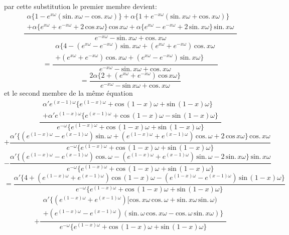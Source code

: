 \documentclass[11pt,a4paper]{article}
\begin{document}
par cette substitution le premier membre devient:
\[ \frac{\begin{array}{c}\alpha\{1 - e^{x\omega}(\text{sin.}\,x\omega - \text{cos.}\,x\omega)\} + \alpha\{1 + e^{-x\omega}(\text{sin.}\,x\omega + \text{cos.}\,x\omega)\} \\  + \alpha\{e^{x\omega} + e^{-x\omega} + 2\,\text{cos}\,x\omega\}\,\text{cos}\,x\omega + \alpha\{e^{x\omega} - e^{-x\omega} + 2\,\text{sin.}\,x\omega\}\,\text{sin.}\,x\omega\end{array}}{e^{-x\omega} - \text{sin.}\,x\omega + \text{cos.}\,x\omega} \]
\[ = \frac{\begin{array}{c}\alpha\{4 - (e^{x\omega} - e^{-x\omega})\,\text{sin.}\,x\omega + (e^{x\omega} + e^{-x\omega})\,\text{cos.}\,x\omega \\  + (e^{x\omega} + e^{-x\omega})\,\text{cos.}\,x\omega + (e^{x\omega} - e^{-x\omega})\,\text{sin.}\,x\omega\}\end{array}}{e^{-x\omega} - \text{sin.}\,x\omega + \text{cos.}\,x\omega} \]
\[ = \frac{2\alpha\{2 + (e^{x\omega} + e^{-x\omega})\,\text{cos}\,x\omega\}}{e^{-x\omega} - \text{sin}\,x\omega + \text{cos.}\,x\omega} \]
et le second membre de la même équation
\[ \frac{\begin{array}{c}\alpha' e^{(x-1)\omega}\{e^{(1-x)\omega} + \text{cos}\,(1-x)\omega + \text{sin}\,(1-x)\omega\} \\  + \alpha' e^{(1-x)\omega}\{e^{(x-1)\omega} + \text{cos}\,(1-x)\omega - \text{sin}\,(1-x)\omega\}\end{array}}{e^{-\omega}\{e^{(1-x)\omega} + \text{cos}\,(1-x)\omega + \text{sin}\,(1-x)\omega\}} \]
\[ + \frac{\alpha'\{(e^{(1-x)\omega} - e^{(x-1)\omega})\,\text{sin.}\,\omega + (e^{(1-x)\omega} + e^{(x-1)\omega})\,\text{cos.}\,\omega + 2\,\text{cos}\,x\omega\}\,\text{cos.}\,x\omega}{e^{-\omega}\{e^{(1-x)\omega} + \text{cos}\,(1-x)\omega + \text{sin}\,(1-x)\omega\}} \]
\[ - \frac{\alpha'\{(e^{(1-x)\omega} - e^{(x-1)\omega})\,\text{cos.}\,\omega - (e^{(1-x)\omega} + e^{(x-1)\omega})\,\text{sin.}\,\omega - 2\,\text{sin.}\,x\omega\}\,\text{sin.}\,x\omega}{e^{-\omega}\{e^{(1-x)\omega} + \text{cos}\,(1-x)\omega + \text{sin}\,(1-x)\omega\}} \]
\[ = \frac{\alpha'\{4 + (e^{(1-x)\omega} + e^{(x-1)\omega})\,\text{cos}\,(1-x)\omega - (e^{(1-x)\omega} - e^{(x-1)\omega})\,\text{sin}\,(1-x)\omega\}}{e^{-\omega}\{e^{(1-x)\omega} + \text{cos}\,(1-x)\omega + \text{sin}\,(1-x)\omega\}} \]
\[ + \frac{\begin{array}{c}\alpha'\{(e^{(1-x)\omega} + e^{(x-1)\omega})[\text{cos.}\,x\omega\,\text{cos.}\,\omega + \text{sin.}\,x\omega\,\text{sin.}\,\omega) \\  + (e^{(1-x)\omega} - e^{(x-1)\omega})(\text{sin.}\,\omega\,\text{cos.}\,x\omega - \text{cos.}\,\omega\,\text{sin.}\,x\omega)\}\end{array}}{e^{-\omega}\{e^{(1-x)\omega} + \text{cos}\,(1-x)\omega + \text{sin}\,(1-x)\omega\}} \]
\end{document}

